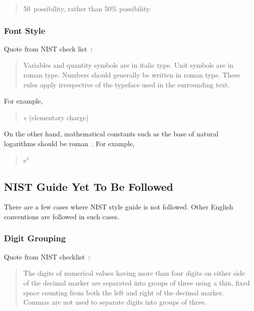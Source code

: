 \begin{quote}
  50\pct\ possibility, rather than 50\% possibility.
\end{quote}

\subsubsection{Font Style}
\label{sec:app:styleguide:Font Style}

Quote from NIST check list~\cite[\#6]{NIST:UnitCheckList}:

\begin{quote}
  Variables and quantity symbols are in italic type.
  Unit symbols are in roman type.
  Numbers should generally be written in roman type.
  These rules apply irrespective of the typeface used in the surrounding
  text.
\end{quote}

For example,
\begin{quote}
  {\textit e} (elementary charge)
\end{quote}

On the other hand, mathematical constants such as the base
of natural logarithms should be roman~\cite{NIST:TypeFaces}.
For example,

\begin{quote}
  $\mathrm{e}^x$
\end{quote}


\subsection{NIST Guide Yet To Be Followed}
\label{sec:app:styleguide:NIST Guides Yet To Be Followed}

There are a few cases where NIST style guide is not followed.
Other English conventions are followed in such cases.

\subsubsection{Digit Grouping}
\label{sec:app:styleguide:Digit Grouping}

Quote from NIST checklist~\cite[\#16]{NIST:UnitCheckList}:

\begin{quote}
  The digits of numerical values having more than four digits on either
  side of the decimal marker are separated into groups of three using
  a thin, fixed space counting from both the left and right of the decimal
  marker.
  Commas are not used to separate digits into groups of three.
\end{quote}

